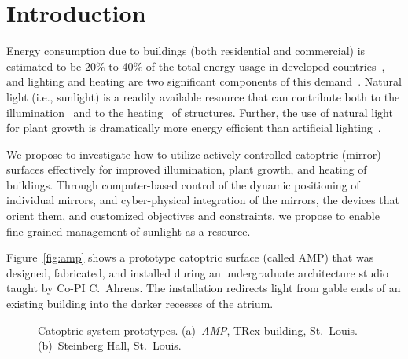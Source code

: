 \section{Introduction}
\label{sec:intro}


Energy consumption due to buildings (both residential and commercial)
is estimated to be 20\% to 40\% of the total energy usage in
developed countries~\cite{pop08}, and
lighting and heating are two significant components of this demand~\cite{keh05}.
Natural light (i.e., sunlight) is a readily available resource that
can contribute both to the illumination~\cite{Leslie03}
and to the heating~\cite{Lunde80} of structures.
Further, the use of natural light for plant growth is dramatically more
energy efficient than artificial lighting~\cite{Bugbee16}. 

We propose to investigate how to utilize actively
controlled catoptric (mirror) surfaces effectively for improved illumination,
plant growth, and heating of buildings.  Through computer-based control of
the dynamic positioning of
individual mirrors, and cyber-physical integration of the mirrors,
the devices
that orient them, and customized objectives and
constraints,
we propose to enable fine-grained management of sunlight as a resource.

Figure~\ref{fig:amp} shows a prototype catoptric surface (called AMP) that was 
designed, fabricated, and installed during an undergraduate architecture studio 
taught by Co-PI C.~Ahrens. The installation redirects light from gable ends of an 
existing building into the darker recesses of the atrium.

\begin{figure}[ht]
\centering
{}
\qquad \qquad
{}
\caption{Catoptric system prototypes.
(a)~\emph{AMP}, TRex building, St.~Louis.
(b)~Steinberg Hall, St.~Louis.
}
\label{fig:proto}
\end{figure}

